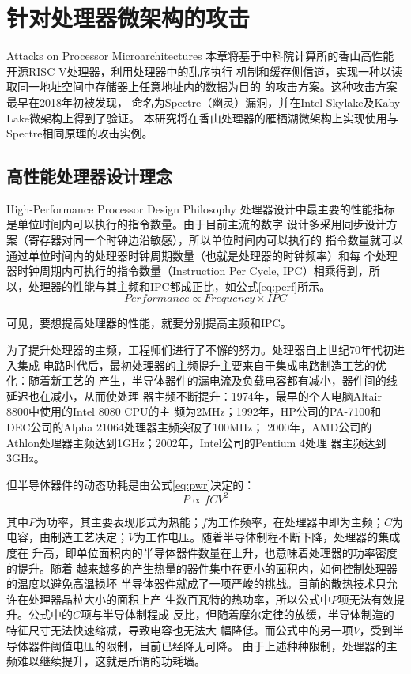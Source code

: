 
\chapter{针对处理器微架构的攻击}{Attacks on Processor Microarchitectures}
本章将基于中科院计算所的香山高性能开源RISC-V处理器，利用处理器中的乱序执行
机制和缓存侧信道，实现一种以读取同一地址空间中存储器上任意地址内的数据为目的
的攻击方案。这种攻击方案最早在2018年初被\citet{kocher_spectre_2019}发现，
命名为Spectre（幽灵）漏洞，并在Intel Skylake及Kaby Lake微架构上得到了验证。
本研究将在香山处理器的雁栖湖微架构上实现使用与Spectre相同原理的攻击实例。


\section{高性能处理器设计理念}{High-Performance Processor Design Philosophy} \label{sec:design-philo}
处理器设计中最主要的性能指标是单位时间内可以执行的指令数量。由于目前主流的数字
设计多采用同步设计方案（寄存器对同一个时钟边沿敏感），所以单位时间内可以执行的
指令数量就可以通过单位时间内的处理器时钟周期数量（也就是处理器的时钟频率）和每
个处理器时钟周期内可执行的指令数量（Instruction Per Cycle, IPC）相乘得到，所
以，处理器的性能与其主频和IPC都成正比，如公式\ref{eq:perf}所示。
\begin{equation}
    Performance \propto Frequency \times IPC \label{eq:perf}
\end{equation}

可见，要想提高处理器的性能，就要分别提高主频和IPC。

为了提升处理器的主频，工程师们进行了不懈的努力。处理器自上世纪70年代初进入集成
电路时代后，最初处理器的主频提升主要来自于集成电路制造工艺的优化：随着新工艺的
产生，半导体器件的漏电流及负载电容都有减小，器件间的线延迟也在减小，从而使处理
器主频不断提升：1974年，最早的个人电脑Altair 8800中使用的Intel 8080 CPU的主
频为2MHz；1992年，HP公司的PA-7100和DEC公司的Alpha 21064处理器主频突破了100MHz；
2000年，AMD公司的Athlon处理器主频达到1GHz；2002年，Intel公司的Pentium 4处理
器主频达到3GHz\cite{enwiki:clock}。

但半导体器件的动态功耗是由公式\ref{eq:pwr}决定的：
\begin{equation}
    P \propto f C V^2 \label{eq:pwr}
\end{equation}

其中$P$为功率，其主要表现形式为热能；$f$为工作频率，在处理器中即为主频；$C$为
电容，由制造工艺决定；$V$为工作电压。随着半导体制程不断下降，处理器的集成度在
升高，即单位面积内的半导体器件数量在上升，也意味着处理器的功率密度的提升。随着
越来越多的产生热量的器件集中在更小的面积内，如何控制处理器的温度以避免高温损坏
半导体器件就成了一项严峻的挑战。目前的散热技术只允许在处理器晶粒大小的面积上产
生数百瓦特的热功率，所以公式中$P$项无法有效提升。公式中的$C$项与半导体制程成
反比，但随着摩尔定律的放缓，半导体制造的特征尺寸无法快速缩减，导致电容也无法大
幅降低。而公式中的另一项$V$，受到半导体器件阈值电压的限制，目前已经降无可降。
由于上述种种限制，处理器的主频难以继续提升，这就是所谓的功耗墙。

